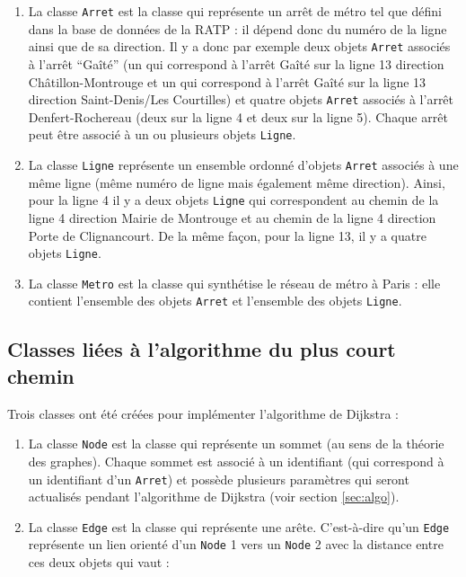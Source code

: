\documentclass[,french]{article}
\begin{document}
\begin{enumerate}
\def\labelenumi{\arabic{enumi}.}
\item
  La classe \texttt{Arret} est la classe qui représente un arrêt de
  métro tel que défini dans la base de données de la RATP : il dépend
  donc du numéro de la ligne ainsi que de sa direction. Il y a donc par
  exemple deux objets \texttt{Arret} associés à l'arrêt ``Gaîté'' (un
  qui correspond à l'arrêt Gaîté sur la ligne 13 direction
  Châtillon-Montrouge et un qui correspond à l'arrêt Gaîté sur la ligne
  13 direction Saint-Denis/Les Courtilles) et quatre objets
  \texttt{Arret} associés à l'arrêt Denfert-Rochereau (deux sur la ligne
  4 et deux sur la ligne 5). Chaque arrêt peut être associé à un ou
  plusieurs objets \texttt{Ligne}.
\item
  La classe \texttt{Ligne} représente un ensemble ordonné d'objets
  \texttt{Arret} associés à une même ligne (même numéro de ligne mais
  également même direction). Ainsi, pour la ligne 4 il y a deux objets
  \texttt{Ligne} qui correspondent au chemin de la ligne 4 direction
  Mairie de Montrouge et au chemin de la ligne 4 direction Porte de
  Clignancourt. De la même façon, pour la ligne 13, il y a quatre objets
  \texttt{Ligne}.
\item
  La classe \texttt{Metro} est la classe qui synthétise le réseau de
  métro à Paris : elle contient l'ensemble des objets \texttt{Arret} et
  l'ensemble des objets \texttt{Ligne}.
\end{enumerate}

\hypertarget{classes-liuxe9es-uxe0-lalgorithme-du-plus-court-chemin}{%
\subsection{Classes liées à l'algorithme du plus court
chemin}\label{classes-liuxe9es-uxe0-lalgorithme-du-plus-court-chemin}}

Trois classes ont été créées pour implémenter l'algorithme de Dijkstra :

\begin{enumerate}
\def\labelenumi{\arabic{enumi}.}
\item
  La classe \texttt{Node} est la classe qui représente un sommet (au
  sens de la théorie des graphes). Chaque sommet est associé à un
  identifiant (qui correspond à un identifiant d'un \texttt{Arret}) et
  possède plusieurs paramètres qui seront actualisés pendant
  l'algorithme de Dijkstra (voir section \ref{sec:algo}).
\item
  La classe \texttt{Edge} est la classe qui représente une arête.
  C'est-à-dire qu'un \texttt{Edge} représente un lien orienté d'un
  \texttt{Node} 1 vers un \texttt{Node} 2 avec la distance entre ces
  deux objets qui vaut :
\end{enumerate}
\end{document}
